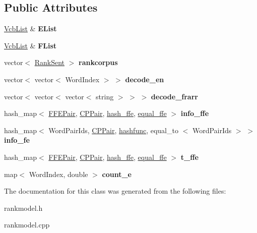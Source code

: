 \subsection*{\-Public \-Attributes}
\begin{DoxyCompactItemize}
\item 
\hypertarget{classRankModel_af108c00b80e39f76da589c11a1b5b5d5}{\hyperlink{classVcbList}{\-Vcb\-List} \& {\bfseries \-E\-List}}\label{classRankModel_af108c00b80e39f76da589c11a1b5b5d5}

\item 
\hypertarget{classRankModel_ae297f41b03aab8061dd74fd93de756bc}{\hyperlink{classVcbList}{\-Vcb\-List} \& {\bfseries \-F\-List}}\label{classRankModel_ae297f41b03aab8061dd74fd93de756bc}

\item 
\hypertarget{classRankModel_ade1e8274cbba92a7dcfbd4201b9a1611}{vector$<$ \hyperlink{classRankSent}{\-Rank\-Sent} $>$ {\bfseries rankcorpus}}\label{classRankModel_ade1e8274cbba92a7dcfbd4201b9a1611}

\item 
\hypertarget{classRankModel_a671fff5f7195c311cd072252c5eacc14}{vector$<$ vector$<$ \-Word\-Index $>$ $>$ {\bfseries decode\-\_\-en}}\label{classRankModel_a671fff5f7195c311cd072252c5eacc14}

\item 
\hypertarget{classRankModel_a6781b7e524ab296c88bb6bbb6be57a17}{vector$<$ vector$<$ vector$<$ string $>$ $>$ $>$ {\bfseries decode\-\_\-frarr}}\label{classRankModel_a6781b7e524ab296c88bb6bbb6be57a17}

\item 
\hypertarget{classRankModel_ab76dd06e6f492e09079ff4fba38b2ea6}{hash\-\_\-map$<$ \hyperlink{classFFEPair}{\-F\-F\-E\-Pair}, \hyperlink{classCPPair}{\-C\-P\-Pair}, \*
\hyperlink{classhash__ffe}{hash\-\_\-ffe}, \hyperlink{classequal__ffe}{equal\-\_\-ffe} $>$ {\bfseries info\-\_\-ffe}}\label{classRankModel_ab76dd06e6f492e09079ff4fba38b2ea6}

\item 
\hypertarget{classRankModel_aad3849a38c175dcb0d0f0db40c193154}{hash\-\_\-map$<$ \-Word\-Pair\-Ids, \hyperlink{classCPPair}{\-C\-P\-Pair}, \*
\hyperlink{classhashfunc}{hashfunc}, equal\-\_\-to\*
$<$ \-Word\-Pair\-Ids $>$ $>$ {\bfseries info\-\_\-fe}}\label{classRankModel_aad3849a38c175dcb0d0f0db40c193154}

\item 
\hypertarget{classRankModel_a589a7f5e93cab85b73bf9ab83fbd0938}{hash\-\_\-map$<$ \hyperlink{classFFEPair}{\-F\-F\-E\-Pair}, \hyperlink{classCPPair}{\-C\-P\-Pair}, \*
\hyperlink{classhash__ffe}{hash\-\_\-ffe}, \hyperlink{classequal__ffe}{equal\-\_\-ffe} $>$ {\bfseries t\-\_\-ffe}}\label{classRankModel_a589a7f5e93cab85b73bf9ab83fbd0938}

\item 
\hypertarget{classRankModel_ab093ca789c7e4372925ebff86fbaf964}{map$<$ \-Word\-Index, double $>$ {\bfseries count\-\_\-e}}\label{classRankModel_ab093ca789c7e4372925ebff86fbaf964}

\end{DoxyCompactItemize}


\-The documentation for this class was generated from the following files\-:\begin{DoxyCompactItemize}
\item 
rankmodel.\-h\item 
rankmodel.\-cpp\end{DoxyCompactItemize}

